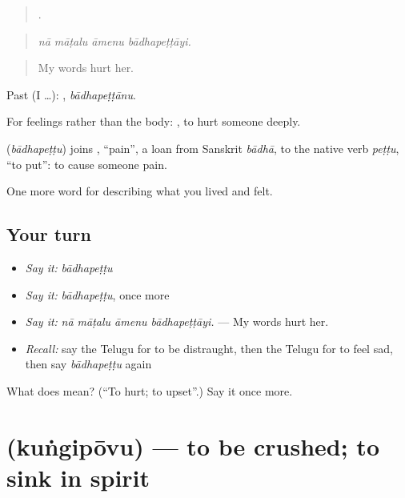 \begin{quote}
   .
\end{quote}

\begin{quote}
\emph{nā māṭalu āmenu bādhapeṭṭāyi.}
\end{quote}

\begin{quote}
My words hurt her.
\end{quote}

Past (I …): , \emph{bādhapeṭṭānu}.

For feelings rather than the body:  , to hurt someone deeply.

\begin{cousinweb}
\textbf{} (\emph{bādhapeṭṭu}) joins , \textquotedblleft{}pain\textquotedblright{}, a loan from Sanskrit \emph{bādhā}, to the native verb \emph{peṭṭu}, \textquotedblleft{}to put\textquotedblright{}: to cause someone pain.
\end{cousinweb}

\begin{grammarlens}[title={What you've built}]
One more word for describing what you lived and felt.
\end{grammarlens}

\subsection*{Your turn}
\begin{itemize}
\raggedright
  \item \emph{Say it:} \emph{bādhapeṭṭu}
  \item \emph{Say it:} \emph{bādhapeṭṭu}, once more
  \item \emph{Say it:} \emph{nā māṭalu āmenu bādhapeṭṭāyi.} — My words hurt her.
  \item \emph{Recall:} say the Telugu for to be distraught, then the Telugu for to feel sad, then say \emph{bādhapeṭṭu} again
\end{itemize}

\begin{tcolorbox}[breakable,colback=teal!4,colframe=teal!35!black,title={Before you move on}]
What does  mean? (\textquotedblleft{}To hurt; to upset\textquotedblright{}.) Say it once more.
\end{tcolorbox}
\section[\texorpdfstring{\te{కుంగిపోవు} (kuṅgipōvu)}{కుంగిపోవు (kuṅgipōvu)}]{ (kuṅgipōvu) — to be crushed; to sink in spirit}

